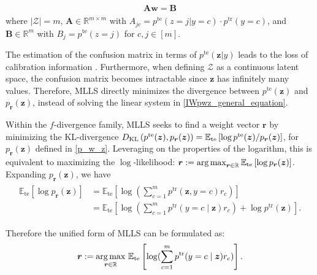 \begin{align}\label{IWpwz_general_equation}
\begin{split}
\boldsymbol{A} \boldsymbol{w} = \boldsymbol{B}
\end{split}
\end{align}
where $\lvert \mathcal{Z} \rvert = m$, ${\boldsymbol{A}} \in \mathbb{R}^{m\times m}$ with ${A}_{jc} = {p^{\text{te}}(z=j|y=c)} \cdot p^{\text{tr}}(y=c)$, and $\boldsymbol{B} \in \mathbb{R}^{m}$ with $B_{j} = p^{\text{te}}(z=j)$ for $c, j \in [m]$.  

The estimation of the confusion matrix in terms of $p^{\text{te}}(\boldsymbol{z}|y)$ leads to the loss of calibration information \citep{mlls}. Furthermore, when defining $\mathcal{Z}$ as a continuous latent space, the confusion matrix becomes intractable since $\boldsymbol{z}$ has infinitely many values. Therefore, MLLS directly minimizes the divergence between $p^{\text{te}}(\boldsymbol{z})$ and $p_{\boldsymbol{r}}(\boldsymbol{z})$, instead of solving the linear system in \cref{IWpwz_general_equation}.

Within the $f$-divergence family, MLLS seeks to find a weight vector $\boldsymbol{r}$ by minimizing the KL-divergence $D_{\mathrm{KL}}\left(p^{\text{te}}(\boldsymbol{z}), p_{\boldsymbol{r}}(\boldsymbol{z})\right)=\mathbb{E}_{\text{te}}\left[\log p^{\text{te}}(\boldsymbol{z}) / p_{\boldsymbol{r}}(\boldsymbol{z})\right]$, for $p_{\boldsymbol{r}}(\boldsymbol{z})$ defined in \cref{p_w_z}. Leveraging on the properties of the logarithm, this is equivalent to maximizing the $\log$-likelihood: $\boldsymbol{r}:=\operatorname*{arg\,max} _{\boldsymbol{r} \in \mathbb{R}} \mathbb{E}_{\text{te}}\left[\log p_{\boldsymbol{r}}(\boldsymbol{z})\right]$. Expanding $p_{\boldsymbol{r}}(\boldsymbol{z})$, we have 
\begin{align}
\begin{split}
\mathbb{E}_{\text{te}}\left[\log p_{\boldsymbol{r}}(\boldsymbol{z})\right] &= \mathbb{E}_{\text{te}}\left[\log (\sum_{c=1}^m p^{\text{tr}}(\boldsymbol{z}, y=c) r_c)\right] \\
&= \mathbb{E}_{\text{te}}\left[\log (\sum_{c=1}^m p^{\text{tr}}(y=c \mid \boldsymbol{z}) r_c) + \log p^{\text{tr}}(\boldsymbol{z})\right]. 
\end{split}
\end{align}

Therefore the unified form of MLLS can be formulated as:
\begin{align}
\begin{split}
\boldsymbol{r}:=\underset{\boldsymbol{r} \in \mathbb{R}}{\operatorname*{arg\,max}}~ \mathbb{E}_{\text{te}}\left[\log (\sum_{c=1}^m p^{\text{tr}}(y=c \mid \boldsymbol{z}) r_c)\right] .
\end{split}
\end{align}

